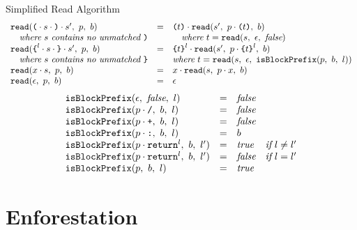 \documentclass[preprint,10pt]{sigplanconf}
\begin{document}
\begin{displayfigure*}{\label{fig:simpleread}Simplified Read Algorithm}
\[\begin{array}{lcll}
    \texttt{read}(\texttt{(} \cdot s \cdot \texttt{)} \cdot s',~p,~b)
    &=&
    \texttt{(}t\texttt{)} \cdot 
      \texttt{read}(s',~p \cdot \texttt{(}t\texttt{)},~b)
    
    \\
    \quad \textit{where}~s~\textit{contains no unmatched}~\texttt{)} 
    &&\quad \textit{where}~t = \texttt{read}(s,~\epsilon,~\textit{false}) 
    \\
    \texttt{read}(
      \texttt{\{}^l \cdot s \cdot \texttt{\}} \cdot s'
    ,~p,~b)
    &=&
    \texttt{\{}t\texttt{\}}^l \cdot 
      \texttt{read}(s',~
        p \cdot \texttt{\{}t\texttt{\}}^l
      ,~b)
    
    \\
    \quad \textit{where}~s~\textit{contains no unmatched}~\texttt{\}} 
    && \textit{where}~t = \texttt{read}(s,~\epsilon,~\texttt{isBlockPrefix}(p,~b,~l))
    \\
    \texttt{read}(x \cdot s,~p,~b)
    &=&
    x \cdot 
      \texttt{read}(s,~p \cdot x,~b)
   
    \\
    \texttt{read}(\epsilon,~p,~b)
    &=&
    \epsilon \\
  \end{array}
\]
\[
  \begin{array}{lcll}
    \texttt{isBlockPrefix}(\epsilon,~\textit{false},~l) &=& \textit{false}
    \\
    \texttt{isBlockPrefix}(p \cdot \texttt{/},~b,~l) &=& \textit{false}
    \\
    \texttt{isBlockPrefix}(p \cdot \texttt{+},~b,~l) &=& \textit{false}
    \\
    \texttt{isBlockPrefix}(p \cdot \texttt{:},~b,~l) &=& b
    \\
    \texttt{isBlockPrefix}(p \cdot \texttt{return}^{l},~b,~l') &=& \textit{true} 
    & \textit{if}~l \not = l'
    \\
    \texttt{isBlockPrefix}(p \cdot \texttt{return}^{l},~b,~l') &=& \textit{false} 
    & \textit{if}~l = l'
    \\
    \texttt{isBlockPrefix}(p ,~b,~l) &=& \textit{true}
    \\
  \end{array}
\]
\end{displayfigure*}


\section{Enforestation}
\label{sec-4}
\end{document}
